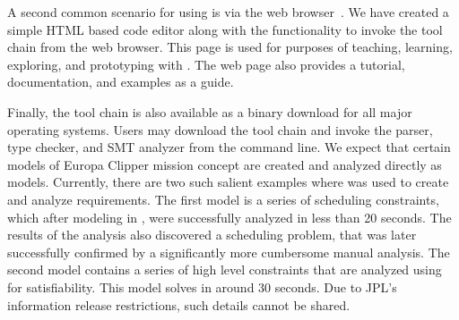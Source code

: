 A second common scenario for using \Klang{} is via the web
browser~\cite{kwebsite}. We have created a simple HTML based \Klang{}
code editor along with the functionality to invoke the \Klang{}
tool chain from the web browser. This page is used for purposes of
teaching, learning, exploring, and prototyping with \Klang{}. The web
page also provides a tutorial, documentation, and \Klang{} examples as
a guide.

Finally, the \Klang{} tool chain is also available as a binary
download for all major operating systems. Users may download the tool
chain and invoke the \Klang{} parser, type checker, and SMT analyzer
from the command line. We expect that certain models of Europa Clipper
mission concept are created and analyzed directly as \Klang{}
models. Currently, there are two such salient examples where \Klang{}
was used to create and analyze requirements. The first model is a
series of scheduling constraints, which after modeling in \Klang{},
were successfully analyzed in less than 20 seconds. The results of the
analysis also discovered a scheduling problem, that was later
successfully confirmed by a significantly more cumbersome manual
analysis. The second model contains a series of high level constraints
that are analyzed using \Klang{} for satisfiability. This model solves
in around 30 seconds. Due to JPL's information release restrictions,
such details cannot be shared.

